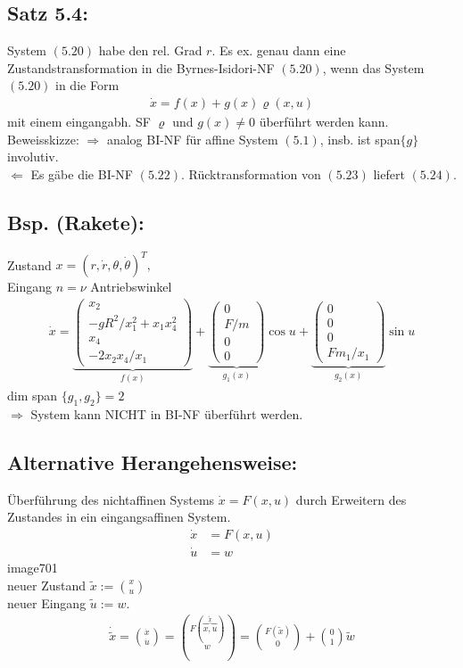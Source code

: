 \documentclass[ngerman]{tudscrreprt}
\begin{document}
\subsection*{Satz 5.4:} System $(5.20)$ habe den rel. Grad $r$. Es ex. genau dann eine Zustandstransformation in die Byrnes-Isidori-NF $(5.20)$, wenn das System $(5.20)$ in die Form \begin{align*}
\dot x = f(x) + g(x)\varrho(x,u) \tag{5.24} \end{align*} mit einem eingangabh. SF $\varrho$ und $g(x)\ne 0 $ überführt werden kann.\\ 
Beweisskizze: $\Rightarrow $ analog BI-NF für affine System $(5.1)$, insb. ist span$\{g\}$ involutiv.\\ 
$\Leftarrow $ Es gäbe die BI-NF $(5.22)$. Rücktransformation von $(5.23)$ liefert $(5.24)$. 
\subsection*{Bsp. (Rakete): } Zustand $x = (r, \dot r , \theta, \dot \theta)^T,$\\Eingang $n = \nu$ Antriebswinkel
\begin{align*}
\dot x = \underbrace{\begin{pmatrix}
x_2\\ -gR^2/x_1^2 + x_1 x_4^2\\ x_4\\  -2 x_2 x_4/x_1
\end{pmatrix}}_{f(x)} + \underbrace{\begin{pmatrix} 0 \\ F/m \\ 0 \\ 0\end{pmatrix}}_{g_1(x)} \cos{u} + \underbrace{\begin{pmatrix} 0\\ 0\\ 0\\F m_1/x_1\end{pmatrix}}_{g_2(x)} \sin{u}
\end{align*}
dim span $\{ g_1, g_2 \} = 2$\\ 
$\Rightarrow $ System kann NICHT in BI-NF überführt werden.\\ 
\subsection*{Alternative Herangehensweise:}
Überführung des nichtaffinen Systems $\dot x = F(x,u)$ durch Erweitern des Zustandes in ein eingangsaffinen System. \begin{align*}
\dot x &= F(x,u)\\ 
\dot u &= w 
\end{align*}
image701\\ 
neuer Zustand $\tilde x := \binom{x}{u}$\\ 
neuer Eingang $\tilde u := w. $
\begin{align*}
\dot{\tilde x} = \binom{\dot x}{\dot u} = \binom{F(\overbrace{x,u}^{\tilde x})}{w} = \binom{F(\tilde x)}{0} + \binom{0}{1}\tilde w
\end{align*}
\end{document}
